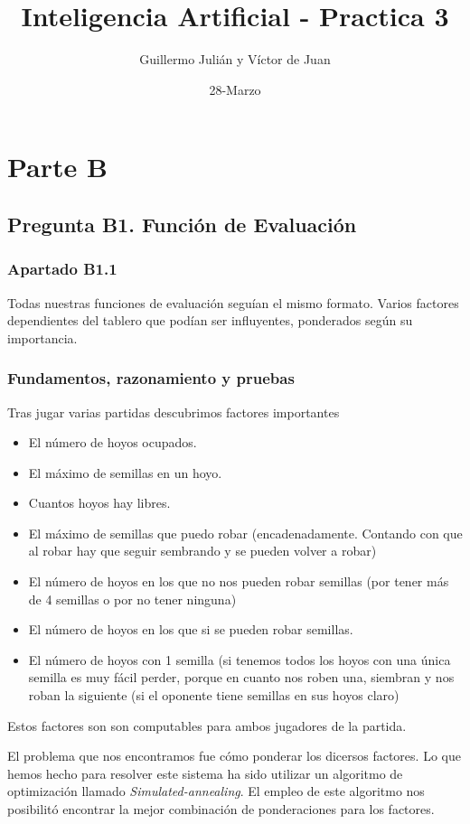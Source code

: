 \documentclass[nochap]{apuntes}
\author{Guillermo Julián y Víctor de Juan}
\date{28-Marzo}
\title{Inteligencia Artificial - Practica 3}
\begin{document}
\section*{Parte B}
\subsection*{Pregunta B1. Función de Evaluación}
\subsubsection*{Apartado B1.1}

Todas nuestras funciones de evaluación seguían el mismo formato. Varios factores dependientes del tablero que podían ser influyentes, ponderados según su importancia.

\subsubsection*{Fundamentos, razonamiento y pruebas}
Tras jugar varias partidas descubrimos factores importantes

\begin{itemize}
\item El número de hoyos ocupados.
\item El máximo de semillas en un hoyo.
\item Cuantos hoyos hay libres.
\item El máximo de semillas que puedo robar (encadenadamente. Contando con que al robar hay que seguir sembrando y se pueden volver a robar)
\item El número de hoyos en los que no nos pueden robar semillas (por tener más de 4 semillas o por no tener ninguna)
\item El número de hoyos en los que si se pueden robar semillas.
\item El número de hoyos con 1 semilla (si tenemos todos los hoyos con una única semilla es muy fácil perder, porque en cuanto nos roben una, siembran y nos roban la siguiente (si el oponente tiene semillas en sus hoyos claro)
\end{itemize}

Estos factores son son computables para ambos jugadores de la partida.

El problema que nos encontramos fue cómo ponderar los dicersos factores. Lo que hemos hecho para resolver este sistema ha sido utilizar un algoritmo de optimización llamado \textit{Simulated-annealing}. El empleo de este algoritmo nos posibilitó encontrar la mejor combinación de ponderaciones para los factores.
\end{document}
